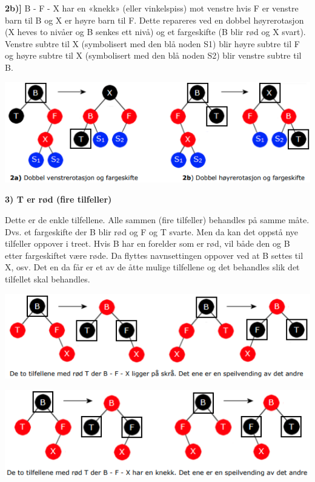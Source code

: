 \documentclass[11pt]{article}
\begin{document}
        \textbf{2b)]} B - F - X har en «knekk» (eller vinkelspiss) mot venstre hvis F er venstre barn til B og X
        er høyre barn til F. Dette repareres ved en dobbel høyrerotasjon (X heves to nivåer og B
        senkes ett nivå) og et fargeskifte (B blir rød og X svart). Venstre subtre til X (symbolisert
        med den blå noden S1) blir høyre subtre til F og høyre subtre til X (symbolisert med den blå
        noden S2) blir venstre subtre til B.

        \includegraphics[center]{f-9.2.5-2ab.png}


\newpage

        \textbf{3) T er rød (fire tilfeller)}

        Dette er de enkle tilfellene. Alle sammen (fire tilfeller) behandles på samme måte. Dvs. et
        fargeskifte der B blir rød og F og T svarte. Men da kan det oppstå nye tilfeller oppover i treet.
        Hvis B har en forelder som er rød, vil både den og B etter fargeskiftet være røde. Da flyttes
        navnsettingen oppover ved at B settes til X, osv. Det en da får er et av de åtte mulige
        tilfellene og det behandles slik det tilfellet skal behandles.

        \includegraphics[center]{f-9.2.5-3.1.png}

        \includegraphics[center]{f-9.2.5-3.2.png}
\end{document}
